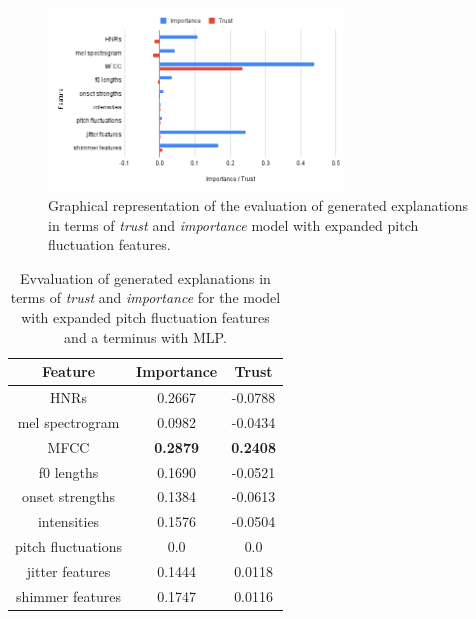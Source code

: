 \documentclass{article}
\begin{document}
	\begin{figure}
			\centering
			\includegraphics[width=0.7\textwidth]{images/exp_mpf.png}
			\caption{Graphical representation of the evaluation of generated explanations in terms of \textit{trust} and \textit{importance} model with expanded pitch fluctuation features.}
			\label{fig:exp_mpf}
		\end{figure}
\begin{table}[htbp]
			\caption{Evvaluation of generated explanations in terms of \textit{trust} and \textit{importance} for the model with expanded pitch fluctuation features and a terminus with MLP.}
			\vspace{10pt}
			\centering
			\begin{tabular}{|c | c | c|}
				\hline
				\textbf{Feature} & \textbf{Importance} & \textbf{Trust} \\
				\hline
				HNRs & 0.2667 & -0.0788 \\ \hline
				mel spectrogram & 0.0982 & -0.0434 \\ \hline
				MFCC & \textbf{0.2879} & \textbf{0.2408} \\ \hline
				f0 lengths & 0.1690 & -0.0521 \\ \hline
				onset strengths & 0.1384 & -0.0613 \\ \hline
				intensities & 0.1576 & -0.0504 \\ \hline
				pitch fluctuations & 0.0 & 0.0 \\ \hline
				jitter features & 0.1444 & 0.0118 \\ \hline
				shimmer features & 0.1747 & 0.0116 \\ \hline
			\end{tabular}
			\label{table:exp-results-mpf-cterm}
		\end{table}
\end{document}
